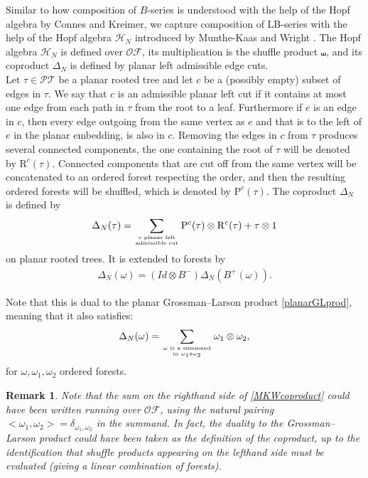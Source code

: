 \documentclass[10pt,a4paper]{article}
\newtheorem{remark}{Remark}
\begin{document}
Similar to how composition of $B$-series is understood with the help of the Hopf algebra by Connes and Kreimer, we capture composition of LB-series with the help of the Hopf algebra $\mathcal{H}_N$ introduced by Munthe-Kaas and Wright \cite{Munthe-KaasWright2008}. The Hopf algebra $\mathcal{H}_N$ is defined over $\mathcal{OF}$, its multiplication is the shuffle product $\shuffle$, and its coproduct $\Delta_N$ is defined by planar left admissible edge cuts. \\
Let $\tau \in \mathcal{PT}$ be a planar rooted tree and let $c$ be a (possibly empty) subset of edges in $\tau$. We say that $c$ is an admissible planar left cut if it contains at most one edge from each path in $\tau$ from the root to a leaf. Furthermore if $e$ is an edge in $c$, then every edge outgoing from the same vertex as $e$ and that is to the left of $e$ in the planar embedding, is also in $c$. Removing the edges in $c$ from $\tau$ produces several connected components, the one containing the root of $\tau$ will be denoted by $\mathrm{R}^c(\tau)$. Connected components that are cut off from the same vertex will be concatenated to an ordered forest respecting the order, and then the resulting ordered forests will be shuffled, which is denoted by $\mathrm{P}^c(\tau)$. The coproduct $\Delta_N$ is defined by
\begin{align}
\label{MKWcoprod}
\Delta_N(\tau)=\sum_{c \text{ planar left} \atop \text{admissible cut}} \mathrm{P}^c(\tau) \otimes \mathrm{R}^c(\tau) + \tau \otimes 1
\end{align}
on planar rooted trees. It is extended to forests by
\begin{align*}
\Delta_N(\omega)=(Id \otimes B^-)\Delta_N(B^+(\omega)).
\end{align*}

Note that this is dual to the planar Grossman--Larson product \eqref{planarGLprod}, meaning that it also satisfies:
\begin{align}
\label{MKWcoproduct}
\Delta_N(\omega)=\sum_{\omega \text{ is a summand} \atop \text{in } \omega_1 \diamond \omega_2} \omega_1 \otimes \omega_2,
\end{align}
for $\omega,\omega_1,\omega_2$ ordered forests.

\begin{remark}
Note that the sum on the righthand side of \eqref{MKWcoproduct} could have been written running over $ \mathcal{OF}$, using the natural pairing $<\omega_1, \omega_2>=\delta_{\omega_1, \omega_2}$ in the summand. In fact, the duality to the Grossman--Larson product could have been taken as the definition of the coproduct, up to the identification that shuffle products appearing on the lefthand side must be evaluated (giving a linear combination of forests). 
\end{remark}
\end{document}
